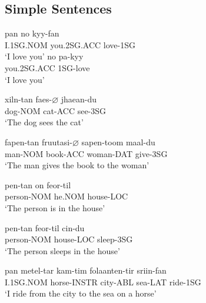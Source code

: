 \documentclass[main.tex]{subfiles}
\begin{document}
\subsection{Simple Sentences}
\begin{exe}
    \ex
        \gll pan no kyy-fan\\
        I.1SG.NOM you.2SG.ACC love-1SG\\
        \trans `I love you'
    \ex
        \gll no pa-kyy\\
        you.2SG.ACC 1SG-love\\
        \trans `I love you'

    \ex \gll xiln-tan faes-$\varnothing$ jhaean-du\\
        dog-NOM cat-ACC see-3SG\\
        \trans `The dog sees the cat'

    \ex \gll fapen-tan fruutasi-$\varnothing$ sapen-toom maal-du\\
        man-NOM book-ACC woman-DAT give-3SG\\
        \trans `The man gives the book to the woman'

    \ex \gll pen-tan on feor-til\\
        person-NOM he.NOM house-LOC\\
        \trans `The person is in the house'

    \ex \gll pen-tan feor-til cin-du\\
        person-NOM house-LOC sleep-3SG\\
        \trans `The person sleeps in the house'

    \ex \gll pan metel-tar kam-tim folaanten-tir sriin-fan\\
        I.1SG.NOM horse-INSTR city-ABL sea-LAT ride-1SG\\
        \trans `I ride from the city to the sea on a horse'
\end{exe}
\end{document}
